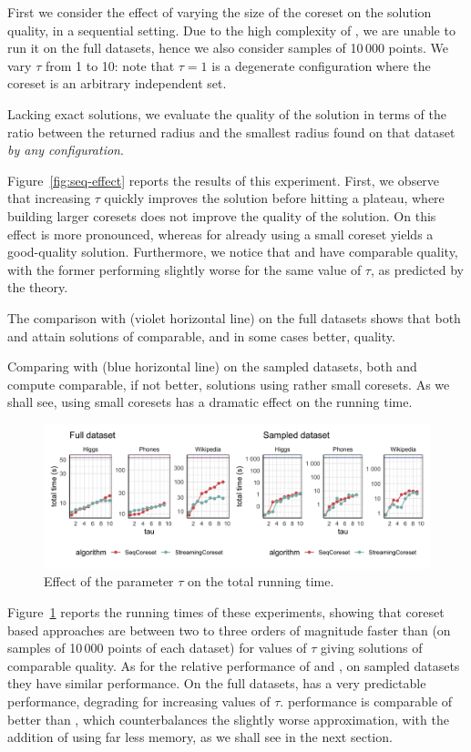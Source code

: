 First we consider the effect of varying the size of the coreset on the solution quality, in a sequential setting.
Due to the high complexity of \chen, we are unable to run it on the
full datasets, hence we also consider samples of 10\,000 points.
We vary $\tau$ from 1 to 10: note that $\tau=1$ is a degenerate configuration where the coreset is an arbitrary independent set.

Lacking exact solutions,
we evaluate the quality of the solution in terms of the ratio between the returned radius
and the smallest radius found on that dataset \emph{by any configuration}.

Figure~\ref{fig:seq-effect} reports the results of this experiment.
First, we observe that increasing $\tau$ quickly improves the solution before hitting a plateau, where
building larger coresets does not improve the quality of the solution.
On \higgs this effect is more pronounced, whereas for \wiki already using a small coreset yields a good-quality solution.
Furthermore, we notice that \stream and \seq have comparable quality, 
with the former performing slightly 
worse for the same value of $\tau$, as predicted by the theory.

The comparison with \kale (violet horizontal line) on the full datasets shows that both \seq and \stream
attain solutions of comparable, and in some cases better, quality.

Comparing with \chen (blue horizontal line) on the sampled datasets, both \seq and \stream compute comparable, 
if not better, solutions using rather small coresets.
As we shall see,
using small coresets has a dramatic effect on the running time.

\begin{figure}
    \includegraphics[width=\textwidth]{seq-time-50}
    \caption{
        \label{fig:seq-time}
        Effect of the parameter $\tau$ on the total running time.
    }
\end{figure}
Figure~\ref{fig:seq-time} reports the running times of these experiments,
showing that coreset based approaches are between two to three orders of magnitude faster than \chen
(on samples of 10\,000 points of each dataset) for values of $\tau$ giving solutions of comparable quality.
As for the relative performance of \seq and \stream, on sampled datasets they have similar performance.
On the full datasets, \seq has a very predictable performance, degrading for increasing values 
of $\tau$.
\stream performance is comparable of better than \seq, which counterbalances the slightly worse
approximation, with the addition of using far less memory, as we shall see in the next section.


